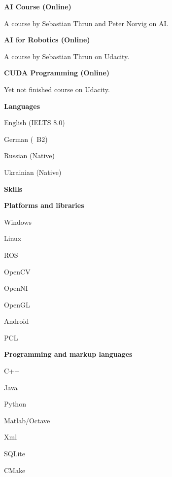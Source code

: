 \documentclass[a4paper,12pt,final]{memoir}
\newcommand{\Sep}{\vspace{1.5em}}
\newcommand{\SmallSep}{\vspace{0.5em}}
\newcommand{\CVSection}[1]
	{\Large\textbf{#1}\par
	\SmallSep\normalsize\normalfont}
\newcommand{\CVItem}[1]
	{\textbf{\color{MidnightBlue} #1}}
\begin{document}
\CVItem{AI Course (Online)}
\begin{compactitem}[\color{MidnightBlue}$\circ$]
	\item A course by Sebastian Thrun and Peter Norvig on AI.
\end{compactitem}
\SmallSep

\CVItem{AI for Robotics (Online)}
\begin{compactitem}[\color{MidnightBlue}$\circ$]
	\item A course by Sebastian Thrun on Udacity.
\end{compactitem}
\SmallSep

\CVItem{CUDA Programming (Online)}
\begin{compactitem}[\color{MidnightBlue}$\circ$]
	\item Yet not finished course on Udacity.
\end{compactitem}
\SmallSep

\CVSection{Languages}
\begin{compactitem}[\color{MidnightBlue}$\circ$]
	\item English (IELTS 8.0)
	\item German (~B2) 
	\item Russian (Native) 
	\item Ukrainian (Native)
\end{compactitem}
\Sep
\CVSection{Skills}
\CVItem{Platforms and libraries}
\begin{multicols}{3}
\begin{compactitem}[\color{MidnightBlue}$\circ$]
	\item Windows
	\item Linux
	\item ROS 
	\item OpenCV
	\item OpenNI 
	\item OpenGL
	\item Android
	\item PCL
\end{compactitem}
\end{multicols}
\SmallSep

\CVItem{Programming and markup languages}
\begin{multicols}{3}
\begin{compactitem}[\color{MidnightBlue}$\circ$]
	\item C++ 
	\item Java 
	\item Python 
	\item Matlab/Octave 
	\item Xml
	\item SQLite
	\item CMake
\end{compactitem}
\end{multicols}
\SmallSep
\end{document}
